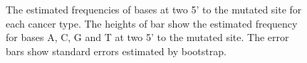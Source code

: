 \documentclass{article}
\begin{document}
\begin{figure}
\quad
{}
  
\caption{The estimated frequencies of bases at two 5' to the mutated site for each cancer type.
The heights of bar show the estimated frequency for bases A, C, G and T at two 5' to the mutated site.
The error bars show standard errors estimated by bootstrap.}
\label{two5prime}

\end{figure}


\clearpage
\end{document}
